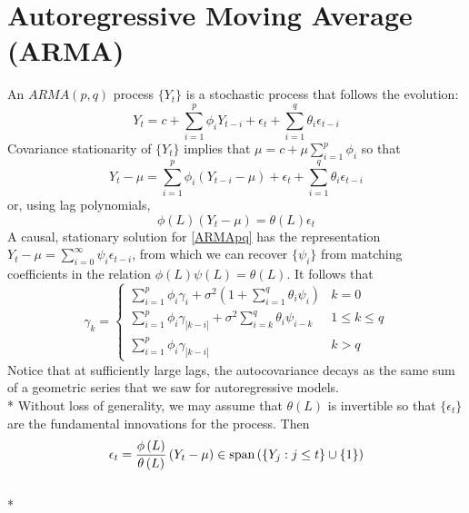 \documentclass[11pt]{article}
\begin{document}
\section{Autoregressive Moving Average (ARMA)}
An $ARMA \left( p,q \right)$ process $\{ Y_t \}$ is a stochastic process that follows the evolution:
\begin{equation} \label{ARMApq}
Y_t = c + \sum_{i=1}^p \phi_i Y_{t-i} + \epsilon_t + \sum_{i=1}^q \theta_i \epsilon_{t-i}
\end{equation}
Covariance stationarity of $\{ Y_t \}$ implies that $\mu = c + \mu \sum_{i=1}^p \phi_i$ so that
\begin{equation} \label{ARMApqmu}
Y_t - \mu = \sum_{i=1}^p \phi_i \left( Y_{t-i} -\mu \right) + \epsilon_t + \sum_{i=1}^q \theta_i \epsilon_{t-i}
\end{equation}
or, using lag polynomials,
\begin{equation}
\phi \left( L \right) \left( Y_t - \mu \right)
= \theta \left( L \right) \epsilon_t
\end{equation}
A causal, stationary solution for \eqref{ARMApq} has the representation $Y_t - \mu = \sum_{i=0}^{\infty} \psi_i \epsilon_{t-i}$, from which we can recover $\{ \psi_i \}$ from matching coefficients in the relation $\phi \left( L \right) \psi \left( L \right) = \theta \left( L \right)$.
It follows that
\begin{equation}
\gamma_k = \left\{ \begin{matrix}
\sum_{i=1}^p \phi_i \gamma_{i} + \sigma^2 \left( 1 + \sum_{i=1}^q \theta_i \psi_{i} \right) & k = 0 \\
\sum_{i=1}^p \phi_i \gamma_{|k-i|} + \sigma^2 \sum_{i=k}^q \theta_i \psi_{i-k} & 1 \leq k \leq q \\
\sum_{i=1}^p \phi_i \gamma_{|k-i|} & k > q
\end{matrix}
\right.
\end{equation}
Notice that at sufficiently large lags, the autocovariance decays as the same sum of a geometric series that we saw for autoregressive models.
\\*
Without loss of generality, we may assume that $\theta \left( L \right)$ is invertible so that $\{ \epsilon_t \}$ are the fundamental innovations for the process. Then
\begin{equation}
\epsilon_t = \frac{\phi \left( L \right)}{\theta \left( L \right) } \left( Y_t - \mu \right) \in \textup{span} \left( \{ Y_j : j \leq t \} \cup \{ 1 \} \right)
\end{equation}
\\*
\end{document}
